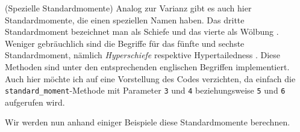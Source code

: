 \begin{Bemerkung}{(Spezielle Standardmomente) \cite{Wiki:Mom}}
Analog zur Varianz gibt es auch hier Standardmomente, die einen speziellen Namen haben. Das dritte Standardmoment bezeichnet man als Schiefe  und das vierte als Wölbung . Weniger gebräuchlich sind die Begriffe für das fünfte und sechste Standardmoment, nämlich \textit{Hyperschiefe}  respektive Hypertailedness . Diese Methoden sind unter den entsprechenden englischen Begriffen implementiert. Auch hier möchte ich auf eine Vorstellung des Codes verzichten, da einfach die \lstinline|standard_moment|-Methode mit Parameter \lstinline|3| und \lstinline|4| beziehungsweise \lstinline|5| und \lstinline|6| aufgerufen wird.
\end{Bemerkung}

Wir werden nun anhand einiger Beispiele diese Standardmomente berechnen.

